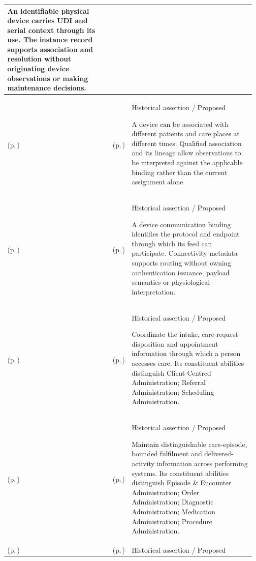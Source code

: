 \begin{longtable}{|>{\raggedright\arraybackslash}p{0.27\TableWidth}|>{\raggedright\arraybackslash}p{0.27\TableWidth}|>{\raggedright\arraybackslash}p{0.46\TableWidth}|}
An identifiable physical device carries UDI and serial context through its use. The instance record supports association and resolution without originating device observations or making maintenance decisions.\\\hline
\nameref{cap:bec-clinical-device-administration} (p.\,\pageref{cap:bec-clinical-device-administration}) & \nameref{cap:bec-device-association} (p.\,\pageref{cap:bec-device-association}) & Historical assertion / Proposed

A device can be associated with different patients and care places at different times. Qualified association and its lineage allow observations to be interpreted against the applicable binding rather than the current assignment alone.\\\hline
\nameref{cap:bec-clinical-device-administration} (p.\,\pageref{cap:bec-clinical-device-administration}) & \nameref{cap:bec-device-connectivity} (p.\,\pageref{cap:bec-device-connectivity}) & Historical assertion / Proposed

A device communication binding identifies the protocol and endpoint through which its feed can participate. Connectivity metadata supports routing without owning authentication issuance, payload semantics or physiological interpretation.\\\hline
\nameref{cap:bec-care-administration-information-enablement} (p.\,\pageref{cap:bec-care-administration-information-enablement}) & \nameref{cap:bec-care-access-transaction-enablement} (p.\,\pageref{cap:bec-care-access-transaction-enablement}) & Historical assertion / Proposed

Coordinate the intake, care-request disposition and appointment information through which a person accesses care. Its constituent abilities distinguish Client-Centred Administration; Referral Administration; Scheduling Administration.\\\hline
\nameref{cap:bec-care-administration-information-enablement} (p.\,\pageref{cap:bec-care-administration-information-enablement}) & \nameref{cap:bec-care-fulfilment-administration-enablement} (p.\,\pageref{cap:bec-care-fulfilment-administration-enablement}) & Historical assertion / Proposed

Maintain distinguishable care-episode, bounded fulfilment and delivered-activity information across performing systems. Its constituent abilities distinguish Episode \& Encounter Administration; Order Administration; Diagnostic Administration; Medication Administration; Procedure Administration.\\\hline
\nameref{cap:bec-care-administration-information-enablement} (p.\,\pageref{cap:bec-care-administration-information-enablement}) & \nameref{cap:bec-care-documentation-communication-enablement} (p.\,\pageref{cap:bec-care-documentation-communication-enablement}) & Historical assertion / Proposed


\end{longtable}
